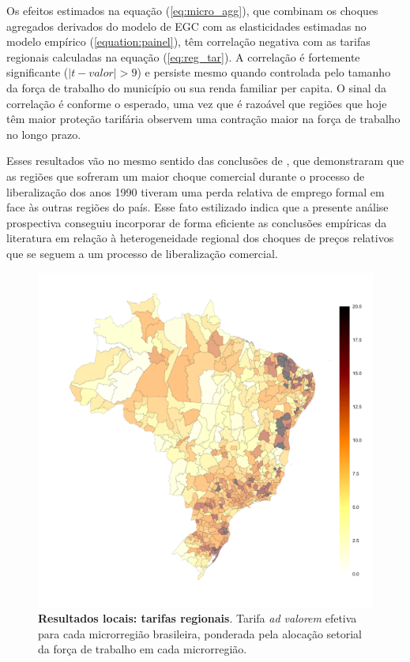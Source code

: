 \documentclass{article}
\begin{document}
Os efeitos estimados na equação (\ref{eq:micro_agg}), que combinam os choques agregados derivados do modelo de EGC com as elasticidades estimadas no modelo empírico (\ref{equation:painel}), têm correlação negativa com as tarifas regionais calculadas na equação (\ref{eq:reg_tar}). A correlação é fortemente significante ($|t-valor| > 9$) e persiste mesmo quando controlada pelo tamanho da força de trabalho do município ou sua renda familiar per capita. O sinal da correlação é conforme o esperado, uma vez que é razoável que regiões que hoje têm maior proteção tarifária observem uma contração maior na força de trabalho no longo prazo.

Esses resultados vão no mesmo sentido das conclusões de \textcite{dixkovak}, que demonstraram que as regiões que sofreram um maior choque comercial durante o processo de liberalização dos anos 1990 tiveram uma perda relativa de emprego formal em face às outras regiões do país. Esse fato estilizado indica que a presente análise prospectiva conseguiu incorporar de forma eficiente as conclusões empíricas da literatura em relação à heterogeneidade regional dos choques de preços relativos que se seguem a um processo de liberalização comercial.

\newpage

\begin{figure}[htbp!]
    \centering
    \includegraphics[scale=0.68]{mapa_micro_tarifa.pdf}
    \caption[Resultados locais: tarifas regionais]{\textbf{Resultados locais: tarifas regionais}. Tarifa \textit{ad valorem} efetiva para cada microrregião brasileira, ponderada pela alocação setorial da força de trabalho em cada microrregião. }
    \label{fig:mapa_micro_tarifa}
\end{figure}
\end{document}
